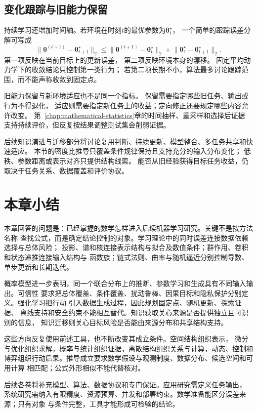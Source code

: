 \subsection{变化跟踪与旧能力保留}
\label{sec:future-fixed-task-tracking-retention}

持续学习还增加时间轴。若环境在时刻$t$的最优参数为$\bm\theta_t^\star$，
一个简单的跟踪误差分解可写成
\[
  \lVert
    \bm\theta^{(t+1)}-\bm\theta_{t+1}^\star
  \rVert_2
  \leq
  \lVert
    \bm\theta^{(t+1)}-\bm\theta_t^\star
  \rVert_2
  +
  \lVert
    \bm\theta_t^\star-\bm\theta_{t+1}^\star
  \rVert_2.
\]
第一项反映在当前目标上的更新误差，
第二项反映环境本身的漂移。
固定平均动力学下的收敛结论只控制第一类行为；
若第二项长期不小，算法最多讨论跟踪范围，而不能声称收敛到固定点。

旧能力保留与新环境适应也不是同一个指标。
保留需要指定哪些旧任务、输出或行为不得退化，
适应则需要指定新任务上的收益；定向修正还要规定哪些内容允许改变。
第~\ref{chap:mathematical-statistics}章的时间抽样、重采样和选择后证据
支持持续评价，但反复按结果调整测试集会削弱证据。

后续知识演进与迁移部分将讨论复用判断、持续更新、模型整合、多任务共享和快速适应。
本节的密度比推导只覆盖条件规律保持且支持充分的输入分布变化；
低秩、参数距离或表示对齐只提供结构线索。
能否从旧经验获得目标任务收益，仍取决于任务关系、数据覆盖和评价协议。

\section{本章小结}
\label{sec:mathematics-and-future-research-summary}

本章回答的问题是：已经掌握的数学怎样进入后续机器学习研究。关键不是按方法名称
查找公式，而是确定结论控制的对象。学习理论中的同时误差连接数据依赖选择与总体风险；
投影、谱和核连接表示结构与拟合及数值条件；群作用、卷积和状态递推连接输入结构与
函数族；链式法则、曲率与随机逼近分别控制导数、单步更新和长期迭代。

概率模型进一步表明，同一个联合分布上的推断、参数学习和生成具有不同输入输出。可信性
要求把总体覆盖、条件覆盖、扰动鲁棒、因果目标和隐私保护分别定义。强化学习把行动
引入数据生成过程，因此规划固定点、随机更新、探索证据、
离线支持和安全约束不能相互替代。知识获取关心来源是否提供独立且可识别的信息，
知识迁移则关心目标风险是否能由来源分布和共享结构支持。

这些方向反复使用前述工具，也不断改变其成立条件。空间结构组织表示，
微分与优化组织求解，概率与统计组织证据，离散结构组织关系与计算，动态、控制和
博弈组织行动后果。推导成立要求数学假设与观测制度、数据分布、候选空间和可用计算
相匹配；公式外形相似不能代替核对。

后续各卷将补充模型、算法、数据协议和专门保证。应用研究需定义任务输出，
系统研究需纳入有限精度、资源预算、并发和部署约束。数学准备能区分误差来源；只有对象
与条件完整，工具才能形成可检验的结论。

